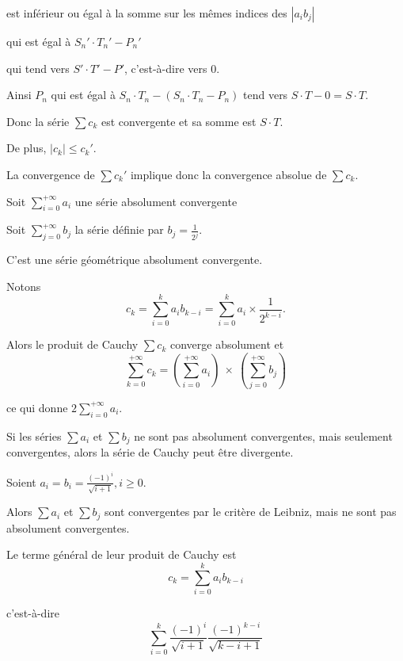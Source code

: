 \change
est inférieur ou égal à la somme sur les mêmes indices des $|a_ib_j| $

\change
qui est égal à
$
 S_n' \cdot T_n'-P_n' 
$

\change
qui tend vers $S' \cdot T'-P'$, c'est-à-dire vers $0$.

\change
Ainsi $P_n$ qui est égal à $S_n \cdot T_n-(S_n \cdot T_n-P_n)$ tend vers $ S \cdot T-0=S \cdot T$.

\change
Donc la série $\sum c_k$ est convergente et sa somme est $S \cdot T$. 

\change
De plus, $|c_k|\le c_k'$. 

\change
La convergence de $\sum c_k'$ implique 
donc la convergence absolue de $\sum c_k$.



\diapo

Soit $\displaystyle\sum_{i=0}^{+\infty} a_i$ une série absolument convergente

\change
Soit $\displaystyle\sum_{j=0}^{+\infty} b_j$ la série définie par $b_j = \frac{1}{2^j}$.

C'est une série géométrique absolument convergente.

\change
Notons
$$c_k = \sum_{i=0}^k a_ib_{k-i} = \sum_{i=0}^k a_i \times \frac{1}{2^{k-i}}.$$

\change
Alors le produit de Cauchy $\sum c_k$ converge absolument et
$$\sum_{k=0}^{+\infty} c_k 
= \left(\sum_{i=0}^{+\infty} a_i\right)\ \times\ \left(\sum_{j=0}^{+\infty} b_j\right)$$

\change
ce qui donne $ 2 \displaystyle\sum_{i=0}^{+\infty} a_i.$


\diapo

Si les séries $\sum a_i$ et $\sum b_j$ ne sont pas absolument 
convergentes, mais seulement convergentes,
alors la série de Cauchy peut être divergente.

\change
Soient $a_i=b_i=\frac{(-1)^{i}}{\sqrt {i+1}}, i\ge 0$.

\change
Alors $\sum a_i$ et $\sum b_j$ sont convergentes par le critère de Leibniz, 
mais ne sont pas absolument convergentes. 

\change
Le terme général de leur produit de Cauchy est
$$c_k = \sum_{i=0}^k a_i b_{k-i} $$

\change
c'est-à-dire
$$
 \sum_{i=0}^k \frac{(-1)^{i}}{\sqrt {i+1}} \frac{(-1)^{k-i}}{\sqrt{k-i+1}} 
 $$
 
